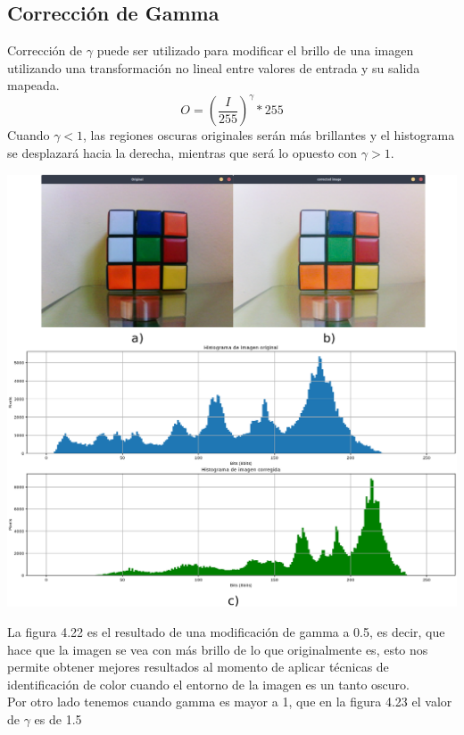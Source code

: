 \subsection{Corrección de Gamma}
Corrección de $\gamma$ puede ser utilizado para modificar el brillo de una imagen utilizando una transformación no lineal entre
valores de entrada y su salida mapeada.
\begin{equation}
	O = \left( \frac{I}{255} \right)^\gamma * 255
\end{equation}
Cuando $\gamma <1$, las regiones oscuras originales serán más brillantes y el histograma se desplazará hacia la derecha, mientras que será
lo opuesto con $\gamma> 1$.
\begin{center}
	\includegraphics[width=0.7 \textwidth]{Contenido/Cuerpo/Capitulo4/Fig23.eps}
	\label{Fig9}
\end{center}
La figura 4.22 es el resultado de una modificación de gamma a 0.5, es decir, que hace que la imagen se vea con más brillo de lo que originalmente
es, esto nos permite obtener mejores resultados al momento de aplicar técnicas de identificación de color cuando el entorno de la imagen
es un tanto oscuro.\\
Por otro lado tenemos cuando gamma es mayor a 1, que en la figura 4.23 el valor de $\gamma$ es de 1.5
